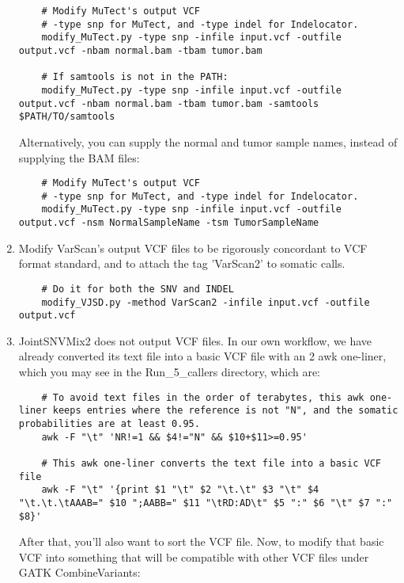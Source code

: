 \documentclass[10pt,letterpaper]{article}
\begin{document}
\begin{sloppypar}
\begin{enumerate}
	\begin{lstlisting}
	# Modify MuTect's output VCF
	# -type snp for MuTect, and -type indel for Indelocator.
	modify_MuTect.py -type snp -infile input.vcf -outfile output.vcf -nbam normal.bam -tbam tumor.bam
	
	# If samtools is not in the PATH:
	modify_MuTect.py -type snp -infile input.vcf -outfile output.vcf -nbam normal.bam -tbam tumor.bam -samtools $PATH/TO/samtools
	\end{lstlisting}
	
	Alternatively, you can supply the normal and tumor sample names, instead of supplying the BAM files:
	\begin{lstlisting}
	# Modify MuTect's output VCF
	# -type snp for MuTect, and -type indel for Indelocator.
	modify_MuTect.py -type snp -infile input.vcf -outfile output.vcf -nsm NormalSampleName -tsm TumorSampleName
	\end{lstlisting}

	\item
	Modify VarScan's output VCF files to be rigorously concordant to VCF format standard, and to attach the tag 'VarScan2' to somatic calls. 
	\begin{lstlisting}
	# Do it for both the SNV and INDEL
	modify_VJSD.py -method VarScan2 -infile input.vcf -outfile output.vcf
	\end{lstlisting}
	

	\item
	JointSNVMix2 does not output VCF files. In our own workflow, we have already converted its text file into a basic VCF file with an 2 awk one-liner, which you may see in the Run\_5\_callers directory, which are:

	\begin{lstlisting}
	# To avoid text files in the order of terabytes, this awk one-liner keeps entries where the reference is not "N", and the somatic probabilities are at least 0.95.
	awk -F "\t" 'NR!=1 && $4!="N" && $10+$11>=0.95'
	
	# This awk one-liner converts the text file into a basic VCF file
	awk -F "\t" '{print $1 "\t" $2 "\t.\t" $3 "\t" $4 "\t.\t.\tAAAB=" $10 ";AABB=" $11 "\tRD:AD\t" $5 ":" $6 "\t" $7 ":" $8}'
	\end{lstlisting}
	
	After that, you'll also want to sort the VCF file. Now, to modify that basic VCF into something that will be compatible with other VCF files under GATK CombineVariants:
	

\end{enumerate}
\end{sloppypar}
\end{document}
